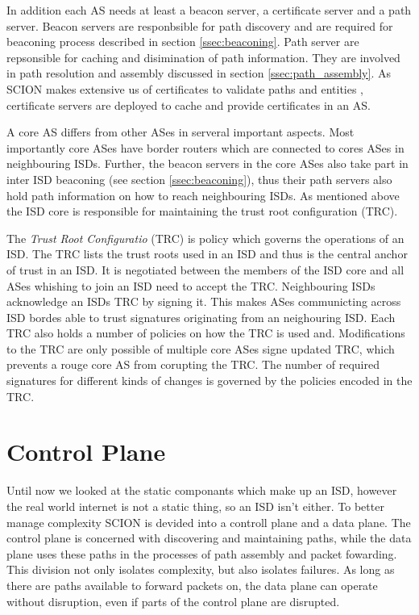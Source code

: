 \documentclass[../eva1_scion.tex]{subfiles}
\begin{document}
    In addition each AS needs at least a beacon server, a certificate server and a path server. Beacon servers are responbsible for path discovery and are required for beaconing process described in section \ref{ssec:beaconing}. Path server are repsonsible for caching and disimination of path information. They are involved in path resolution and assembly discussed in section \ref{ssec:path_assembly}. As SCION makes extensive us of certificates to validate paths and entities \cite{scion_2011}, certificate servers are deployed to cache and provide certificates in an AS.

    A core AS differs from other ASes in serveral important aspects. Most importantly core ASes have border routers which are connected to cores ASes in neighbouring ISDs. Further, the beacon servers in the core ASes also take part in inter ISD beaconing (see section \ref{ssec:beaconing}), thus their path servers also hold path information on how to reach neighbouring ISDs. As mentioned above the ISD core is responsible for maintaining the trust root configuration (TRC).

    The \textit{Trust Root Configuratio} (TRC) is policy which governs the operations of an ISD. The TRC lists the trust roots used in an ISD and thus is the central anchor of trust in an ISD. It is negotiated between the members of the ISD core and all ASes whishing to join an ISD need to accept the TRC. Neighbouring ISDs acknowledge an ISDs TRC by signing it. This makes ASes communicting across ISD bordes able to trust signatures originating from an neighouring ISD. Each TRC also holds a number of policies on how the TRC is used and. Modifications to the TRC are only possible of multiple core ASes signe updated TRC, which prevents a rouge core AS from corupting the TRC. The number of required signatures for different kinds of changes is governed by the policies encoded in the TRC.

    \section{Control Plane}
    Until now we looked at the static componants which make up an ISD, however the real world internet is not a static thing, so an ISD isn't either. To better manage complexity SCION is devided into a controll plane and a data plane. The control plane is concerned with discovering and maintaining paths, while the data plane uses these paths in the processes of path assembly and packet fowarding. This division not only isolates complexity, but also isolates failures. As long as there are paths available to forward packets on, the data plane can operate without disruption, even if parts of the control plane are disrupted.
\end{document}
